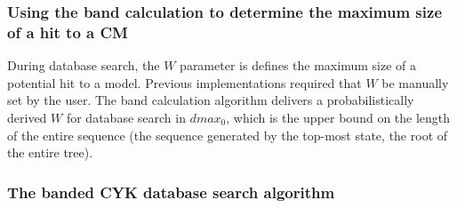 \documentclass[11pt]{article}
\begin{document}
\subsubsection{Using the band calculation to determine the maximum
  size of a hit to a CM}
During database search, the $W$ parameter is defines
the maximum size of a potential hit to a model. Previous implementations
required that $W$ be manually set by the user. 
The band calculation algorithm delivers a probabilistically derived
$W$ for database search in $dmax_0$, which is the upper bound on the
length of the entire sequence (the sequence generated by the top-most
state, the root of the entire tree). 

\subsubsection{The banded CYK database search algorithm}

\end{document}
